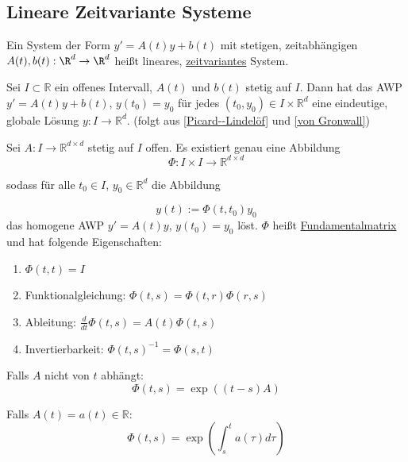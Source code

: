 \documentclass[11pt, a4paper]{article}
\begin{document}
\vspace{0.3cm} \par \subsection{Lineare Zeitvariante Systeme}

\begin{definition}
Ein System der Form $y'=A(t)y+b(t)$ mit stetigen, zeitabhängigen
$A(t), b(t): \R^d \to \R^d$ heißt lineares, \underline{zeitvariantes} System.
\end{definition}

\begin{theorem}
Sei $I\subset\mathbb{R}$ ein offenes Intervall, $A(t)$ und $b(t)$ stetig auf $I$.
Dann hat das AWP
$y'=A(t)y+b(t)$, $y(t_0)=y_0$
für jedes $(t_0,y_0)\in I\times\mathbb{R}^d$
eine eindeutige, globale Lösung $y:I\to\mathbb{R}^d$. (folgt aus \ref{Picard--Lindelöf} und \ref{von Gronwall})
\end{theorem}



\begin{theorem} Sei $A:I\to\mathbb{R}^{d\times d}$ stetig auf $I$ offen.
Es existiert genau eine Abbildung
\[
\Phi:I\times I \to \mathbb{R}^{d\times d}
\]

sodass für alle $t_0\in I$, $y_0\in\mathbb{R}^d$ die Abbildung

\[
y(t):=\Phi(t,t_0)y_0
\]
das homogene AWP $y'=A(t)y$, $y(t_0)=y_0$ löst.
$\Phi$ heißt \underline{Fundamentalmatrix} und hat folgende Eigenschaften:

\begin{enumerate}
\item $\Phi(t,t)=I$
\item Funktionalgleichung: $\Phi(t,s)=\Phi(t,r)\Phi(r,s)$
\item Ableitung: $\frac{d}{dt}\Phi(t,s)=A(t)\Phi(t,s)$
\item Invertierbarkeit: $\Phi(t,s)^{-1}=\Phi(s,t)$
\end{enumerate}

Falls $A$ nicht von $t$ abhängt:
\[
\Phi(t,s)=\exp((t-s)A)
\]

Falls $A(t)=a(t)\in\mathbb{R}$:
\[
\Phi(t,s)=\exp\left(\int_s^t a(\tau)d\tau\right)
\]
    
\end{theorem}
\end{document}

